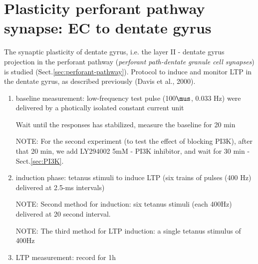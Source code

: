 \section{Plasticity perforant pathway synapse: EC to dentate gyrus}
\label{sec:dentate-gyrus-synaptic-plasticity}

The synaptic plasticity of dentate gyrus, i.e. the layer II - dentate gyrus
projection in the perforant pathway ({\it perforant path-dentate granule cell
synapses}) is studied (Sect.\ref{sec:perforant-pathway}). Protocol to induce and
monitor LTP in the dentate gyrus, as described previously (Davis et al., 2000).
\begin{enumerate}
  \item baseline measurement: low-frequency test pulse (100$\mus$, 0.033 Hz)
  were delivered by a photically isolated constant current unit
  
  Wait until the responses has stabilized, measure the baseline for 20 min
  
  NOTE: For the second experiment (to test the effect of blocking PI3K), after
  that 20 min, we add LY294002 5mM  - PI3K inhibitor, and wait for 30 min -
  Sect.\ref{sec:PI3K}.
  
  
  \item induction phase: tetanus stimuli to induce LTP (six trains of pulses
  (400 Hz) delivered at 2.5-ms intervals)
  
  NOTE: Second method for induction: six tetanus stimuli (each 400Hz) delivered
  at 20 second interval.
  
  NOTE: The third method for LTP induction: a single tetanus stimulus of 400Hz
  
  \item LTP measurement: record for 1h
\end{enumerate}

